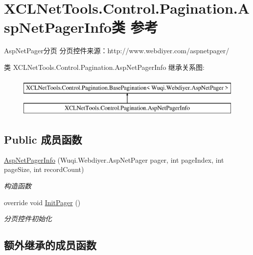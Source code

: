 \hypertarget{class_x_c_l_net_tools_1_1_control_1_1_pagination_1_1_asp_net_pager_info}{}\section{X\+C\+L\+Net\+Tools.\+Control.\+Pagination.\+Asp\+Net\+Pager\+Info类 参考}
\label{class_x_c_l_net_tools_1_1_control_1_1_pagination_1_1_asp_net_pager_info}


Asp\+Net\+Pager分页 分页控件来源：http\+://www.webdiyer.\+com/aspnetpager/  


类 X\+C\+L\+Net\+Tools.\+Control.\+Pagination.\+Asp\+Net\+Pager\+Info 继承关系图\+:\begin{figure}[H]
\begin{center}
\leavevmode
\includegraphics[height=2.000000cm]{class_x_c_l_net_tools_1_1_control_1_1_pagination_1_1_asp_net_pager_info}
\end{center}
\end{figure}
\subsection*{Public 成员函数}
\begin{DoxyCompactItemize}
\item 
\hyperlink{class_x_c_l_net_tools_1_1_control_1_1_pagination_1_1_asp_net_pager_info_aef75d024dd66cc9d75cd61d4dddcb27b}{Asp\+Net\+Pager\+Info} (Wuqi.\+Webdiyer.\+Asp\+Net\+Pager pager, int page\+Index, int page\+Size, int record\+Count)
\begin{DoxyCompactList}\small\item\em 构造函数 \end{DoxyCompactList}\item 
override void \hyperlink{class_x_c_l_net_tools_1_1_control_1_1_pagination_1_1_asp_net_pager_info_a46b208799b1d020c45571657c707ddf0}{Init\+Pager} ()
\begin{DoxyCompactList}\small\item\em 分页控件初始化 \end{DoxyCompactList}\end{DoxyCompactItemize}
\subsection*{额外继承的成员函数}


